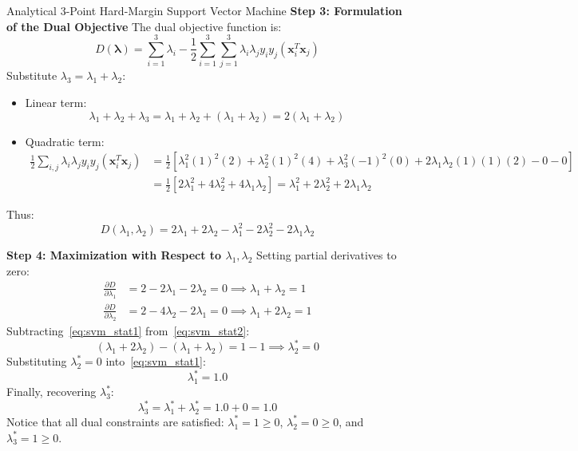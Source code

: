 \begin{examplebox}[breakable]{Analytical 3-Point Hard-Margin Support Vector Machine}
\textbf{Step 3: Formulation of the Dual Objective}
The dual objective function is:
\begin{equation}
D(\boldsymbol{\lambda}) = \sum_{i=1}^3 \lambda_i - \frac{1}{2}\sum_{i=1}^3 \sum_{j=1}^3 \lambda_i \lambda_j y_i y_j (\mathbf{x}_i^T \mathbf{x}_j)
\end{equation}
Substitute $\lambda_3 = \lambda_1 + \lambda_2$:
\begin{itemize}
    \item Linear term:
    \begin{equation}
    \lambda_1 + \lambda_2 + \lambda_3 = \lambda_1 + \lambda_2 + (\lambda_1 + \lambda_2) = 2(\lambda_1 + \lambda_2)
    \end{equation}
    \item Quadratic term:
    \begin{align}
    \frac{1}{2} \sum_{i,j} \lambda_i \lambda_j y_i y_j (\mathbf{x}_i^T \mathbf{x}_j) &= \frac{1}{2} \left[ \lambda_1^2 (1)^2 (2) + \lambda_2^2 (1)^2 (4) + \lambda_3^2 (-1)^2 (0) + 2\lambda_1 \lambda_2 (1)(1)(2) - 0 - 0 \right] \nonumber \\
    &= \frac{1}{2} \left[ 2\lambda_1^2 + 4\lambda_2^2 + 4\lambda_1 \lambda_2 \right] = \lambda_1^2 + 2\lambda_2^2 + 2\lambda_1 \lambda_2
    \end{align}
\end{itemize}
Thus:
\begin{equation}
D(\lambda_1, \lambda_2) = 2\lambda_1 + 2\lambda_2 - \lambda_1^2 - 2\lambda_2^2 - 2\lambda_1 \lambda_2
\end{equation}

\textbf{Step 4: Maximization with Respect to $\lambda_1, \lambda_2$}
Setting partial derivatives to zero:
\begin{align}
\frac{\partial D}{\partial \lambda_1} &= 2 - 2\lambda_1 - 2\lambda_2 = 0 \implies \lambda_1 + \lambda_2 = 1 \label{eq:svm_stat1} \\
\frac{\partial D}{\partial \lambda_2} &= 2 - 4\lambda_2 - 2\lambda_1 = 0 \implies \lambda_1 + 2\lambda_2 = 1 \label{eq:svm_stat2}
\end{align}
Subtracting~\eqref{eq:svm_stat1} from~\eqref{eq:svm_stat2}:
\begin{equation}
(\lambda_1 + 2\lambda_2) - (\lambda_1 + \lambda_2) = 1 - 1 \implies \lambda_2^* = 0
\end{equation}
Substituting $\lambda_2^* = 0$ into~\eqref{eq:svm_stat1}:
\begin{equation}
\lambda_1^* = 1.0
\end{equation}
Finally, recovering $\lambda_3^*$:
\begin{equation}
\lambda_3^* = \lambda_1^* + \lambda_2^* = 1.0 + 0 = 1.0
\end{equation}
Notice that all dual constraints are satisfied: $\lambda_1^* = 1 \ge 0$, $\lambda_2^* = 0 \ge 0$, and $\lambda_3^* = 1 \ge 0$.


\end{examplebox}
